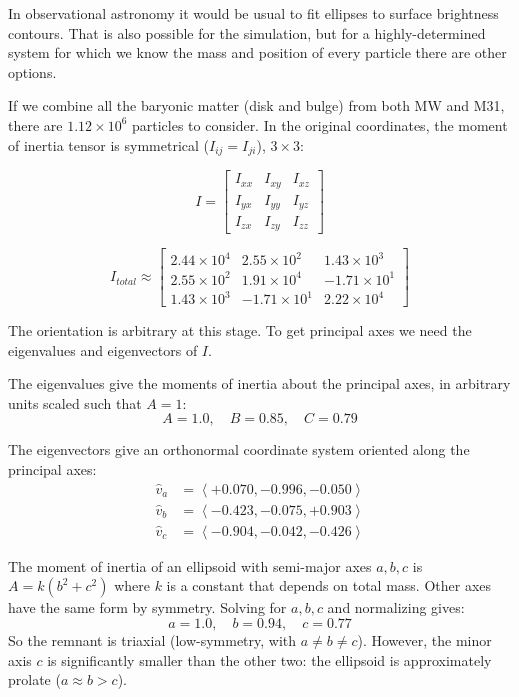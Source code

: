 \documentclass[twocolumn]{aastex63}
\begin{document}
In observational astronomy it would be usual to fit ellipses to surface brightness contours. That is also possible for the simulation, but for a highly-determined system for which we know the mass and position of every particle there are other options.

If we combine all the baryonic matter (disk and bulge) from both MW and M31, there are $1.12 \times 10^6$ particles to consider. In the original coordinates, the moment of inertia tensor is symmetrical ($I_{ij} = I_{ji}$), $3 \times 3$:


\[ I = \begin{bmatrix}
			I_{xx} & I_{xy} & I_{xz}\\
			I_{yx} & I_{yy} & I_{yz}\\
			I_{zx} & I_{zy} & I_{zz} 
		\end{bmatrix} \]
		
\[  I_{total} \approx \begin{bmatrix}
		2.44 \times 10^4 & 2.55 \times 10^2 & 1.43 \times 10^3\\
		2.55 \times 10^2 & 1.91 \times 10^4 & -1.71 \times 10^1\\
		1.43 \times 10^3 & -1.71 \times 10^1 & 2.22 \times 10^4 
	\end{bmatrix} \]\vspace{5mm}
		
The orientation is arbitrary at this stage. To get principal axes we need the eigenvalues and eigenvectors of $I$. 

The eigenvalues give the moments of inertia about the principal axes, in arbitrary units scaled such that $A=1$:
\[ A=1.0,\quad B= 0.85,\quad C=0.79 \]

The eigenvectors give an orthonormal coordinate system oriented along the principal axes:
\begin{align*}
	\hat{v}_a &= \left< +0.070, -0.996 , -0.050 \right> \\
	\hat{v}_b &= \left< -0.423, -0.075,  +0.903 \right> \\
	\hat{v}_c &= \left< -0.904, -0.042, -0.426 \right>
\end{align*}

The moment of inertia of an ellipsoid with semi-major axes $a, b, c$ is $A = k(b^2 + c^2)$ where $k$ is a constant that depends on total mass. Other axes have the same form by symmetry. Solving for $a, b, c$ and normalizing gives:
\[ a = 1.0,\quad b = 0.94,\quad c = 0.77 \]
So the remnant is triaxial (low-symmetry, with $a \ne b \ne c$). However, the minor axis $c$ is significantly smaller than the other two: the ellipsoid is approximately prolate ($a \approx b > c$).
\end{document}
